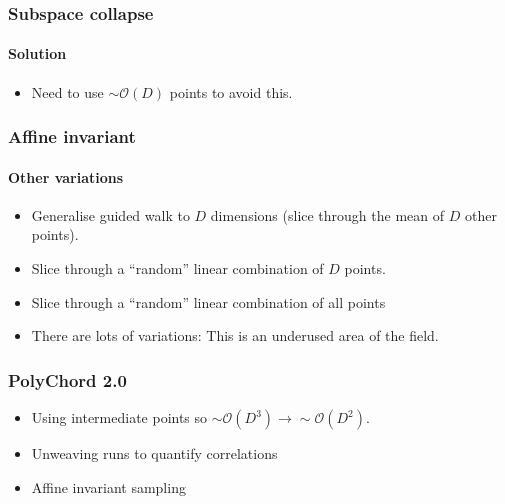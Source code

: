 \documentclass[]{beamer}
\begin{document}
\begin{frame}
  \frametitle{Subspace collapse}
  \framesubtitle{Solution}
  \begin{itemize}
    \pause\item Need to use $\sim\mathcal{O}(D)$ points to avoid this.
  \end{itemize}
\end{frame}


\begin{frame}
  \frametitle{Affine invariant}
  \framesubtitle{Other variations}
  \begin{itemize}
    \pause\item Generalise guided walk to $D$ dimensions (slice through the mean of $D$ other points).
    \pause\item Slice through a ``random'' linear combination of $D$ points.
    \pause\item Slice through a ``random'' linear combination of all points
    \pause\item There are lots of variations: This is an underused area of the field.
  \end{itemize}
\end{frame}


\begin{frame}
  \frametitle{PolyChord 2.0}
  \begin{itemize}
    \pause\item Using intermediate points so $\sim\mathcal{O}(D^3)\to\sim\mathcal{O}(D^2)$.
    \pause\item Unweaving runs to quantify correlations
    \pause\item Affine invariant sampling
  \end{itemize}
\end{frame}
\end{document}
